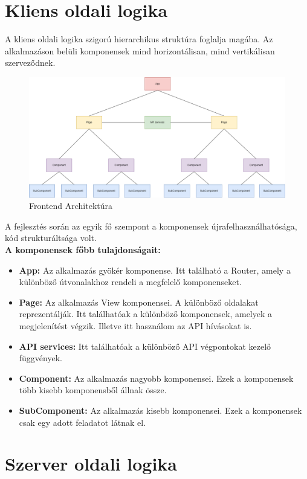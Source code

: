 \section{Kliens oldali logika}
A kliens oldali logika szigorú hierarchikus struktúra foglalja magába. Az alkalmazáson belüli komponensek mind horizontálisan, mind vertikálisan szerveződnek.
\begin{figure}[H]
    \centering
    \includegraphics[width=14.0truecm]{images/Frontend_architecture.png}
    \caption{Frontend Architektúra}
    \label{fig:frontend_architecture}
\end{figure}
A fejlesztés során az egyik fő szempont a komponensek újrafelhasználhatósága, kód strukturáltsága volt.
\\
\textbf{A komponensek főbb tulajdonságait:}
\begin{itemize}
    \item \textbf{App:} Az alkalmazás gyökér komponense. Itt található a Router, amely a különböző útvonalakhoz rendeli a megfelelő komponenseket.
    \item \textbf{Page:} Az alkalmazás View komponensei. A különböző oldalakat reprezentálják. Itt találhatóak a különböző komponensek, amelyek a megjelenítést végzik. Illetve itt használom az API hívásokat is.
    \item \textbf{API services:} Itt találhatóak a különböző API végpontokat kezelő függvények.
    \item \textbf{Component:} Az alkalmazás nagyobb komponensei. Ezek a komponensek több kisebb komponensből állnak össze.
    \item \textbf{SubComponent:} Az alkalmazás kisebb komponensei. Ezek a komponensek csak egy adott feladatot látnak el.
\end{itemize}


\section{Szerver oldali logika}
